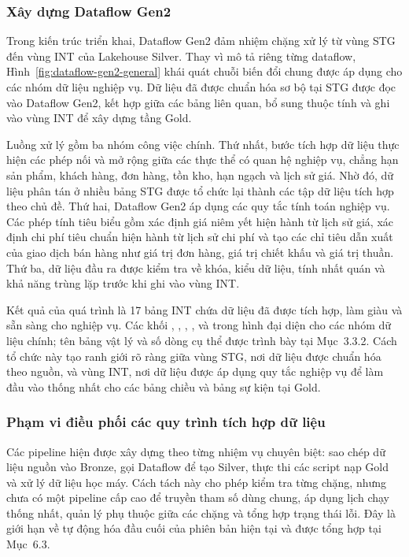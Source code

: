 \subsubsection{Xây dựng Dataflow Gen2}

Trong kiến trúc triển khai, Dataflow Gen2 đảm nhiệm chặng xử lý từ vùng STG đến vùng INT của Lakehouse Silver. Thay vì mô tả riêng từng dataflow, Hình~\ref{fig:dataflow-gen2-general} khái quát chuỗi biến đổi chung được áp dụng cho các nhóm dữ liệu nghiệp vụ. Dữ liệu đã được chuẩn hóa sơ bộ tại STG được đọc vào Dataflow Gen2, kết hợp giữa các bảng liên quan, bổ sung thuộc tính và ghi vào vùng INT để xây dựng tầng Gold.


Luồng xử lý gồm ba nhóm công việc chính. Thứ nhất, bước tích hợp dữ liệu thực hiện các phép nối và mở rộng giữa các thực thể có quan hệ nghiệp vụ, chẳng hạn sản phẩm, khách hàng, đơn hàng, tồn kho, hạn ngạch và lịch sử giá. Nhờ đó, dữ liệu phân tán ở nhiều bảng STG được tổ chức lại thành các tập dữ liệu tích hợp theo chủ đề. Thứ hai, Dataflow Gen2 áp dụng các quy tắc tính toán nghiệp vụ. Các phép tính tiêu biểu gồm xác định giá niêm yết hiện hành từ lịch sử giá, xác định chi phí tiêu chuẩn hiện hành từ lịch sử chi phí và tạo các chỉ tiêu dẫn xuất của giao dịch bán hàng như giá trị đơn hàng, giá trị chiết khấu và giá trị thuần. Thứ ba, dữ liệu đầu ra được kiểm tra về khóa, kiểu dữ liệu, tính nhất quán và khả năng trùng lặp trước khi ghi vào vùng INT.

Kết quả của quá trình là 17 bảng INT chứa dữ liệu đã được tích hợp, làm giàu và sẵn sàng cho nghiệp vụ. Các khối , , , ,  và  trong hình đại diện cho các nhóm dữ liệu chính; tên bảng vật lý và số dòng cụ thể được trình bày tại Mục~3.3.2. Cách tổ chức này tạo ranh giới rõ ràng giữa vùng STG, nơi dữ liệu được chuẩn hóa theo nguồn, và vùng INT, nơi dữ liệu được áp dụng quy tắc nghiệp vụ để làm đầu vào thống nhất cho các bảng chiều và bảng sự kiện tại Gold.

\subsubsection{Phạm vi điều phối các quy trình tích hợp dữ liệu}

Các pipeline hiện được xây dựng theo từng nhiệm vụ chuyên biệt: sao chép dữ liệu nguồn vào Bronze, gọi Dataflow để tạo Silver, thực thi các script nạp Gold và xử lý dữ liệu học máy. Cách tách này cho phép kiểm tra từng chặng, nhưng chưa có một pipeline cấp cao để truyền tham số dùng chung, áp dụng lịch chạy thống nhất, quản lý phụ thuộc giữa các chặng và tổng hợp trạng thái lỗi. Đây là giới hạn về tự động hóa đầu cuối của phiên bản hiện tại và được tổng hợp tại Mục~6.3.

